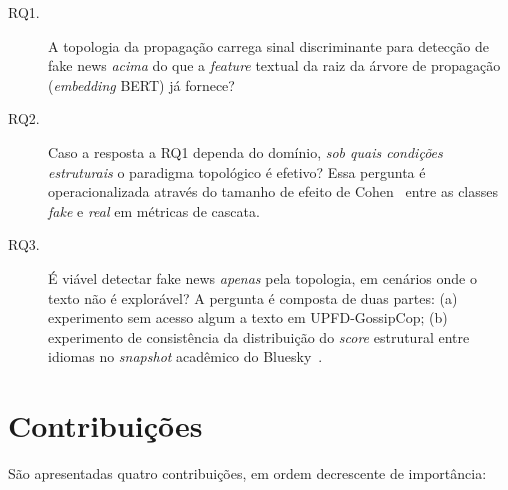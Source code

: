 \begin{description}
\item[RQ1.] A topologia da propaga\c{c}\~ao carrega sinal discriminante
  para detec\c{c}\~ao de fake news \emph{acima} do que a \emph{feature}
  textual da raiz da \'arvore de propaga\c{c}\~ao (\emph{embedding} BERT)
  j\'a fornece?

\item[RQ2.] Caso a resposta a RQ1 dependa do dom\'inio, \emph{sob quais
  condi\c{c}\~oes estruturais} o paradigma topol\'ogico \'e efetivo?
  Essa pergunta \'e operacionalizada atrav\'es do tamanho de efeito de
  Cohen~\cite{cohen1988statistical} entre as classes \emph{fake} e
  \emph{real} em m\'etricas de cascata.

\item[RQ3.] \'E vi\'avel detectar fake news \emph{apenas} pela topologia,
  em cen\'arios onde o texto n\~ao \'e explor\'avel? A pergunta \'e
  composta de duas partes: (a) experimento sem acesso algum a texto em
  UPFD-GossipCop; (b) experimento de consist\^encia da distribui\c{c}\~ao
  do \emph{score} estrutural entre idiomas no \emph{snapshot}
  acad\^emico do Bluesky~\cite{failla2024bluesky, kleppmann2024atproto}.
\end{description}

\section{Contribui\c{c}\~oes}
\label{sec:contribuicoes}

S\~ao apresentadas quatro contribui\c{c}\~oes, em ordem decrescente de
import\^ancia:

